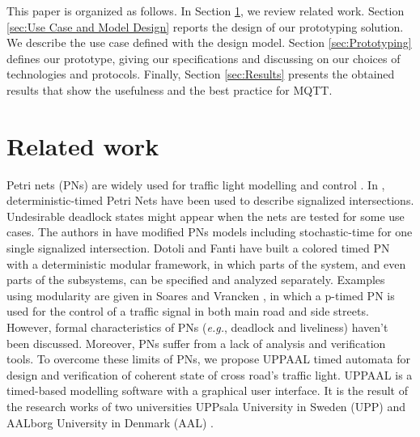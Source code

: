 \documentclass[conference]{../../setup/IEEEtran}
\begin{document}
This paper is organized as follows. In Section \ref{Sec:Related_Works}, we review related work. 
Section \ref{sec:Use Case and Model Design} reports the design of our prototyping solution. We describe the use case defined with the design model.
Section \ref{sec:Prototyping} defines our prototype, giving our specifications and discussing on our choices of technologies and protocols. Finally, Section \ref{sec:Results} presents the obtained results that show the usefulness and the best practice for MQTT.

\section{Related work}
\label{Sec:Related_Works}

Petri nets (PNs) are widely used for traffic light modelling and control \cite{huang_modular_2014}.
In  \cite{difebbraro_trafficresponsive_2006}, deterministic-timed Petri Nets have been used to describe signalized intersections. Undesirable deadlock states might appear when the nets are tested for some use cases. The authors in \cite{febbraro_using_2009} have modified PNs models including  stochastic-time for one single signalized intersection. Dotoli and Fanti \cite{dotoli_urban_2004} have built a colored timed PN with a deterministic modular framework, in which parts of the system, and even parts of the subsystems, can be specified and analyzed separately.
Examples using modularity are given in Soares and Vrancken \cite{dossantossoares_modular_2012}, in which a p-timed PN is used for the control of a traffic signal in both main road and side streets. However, formal characteristics of PNs (\emph{e.g.}, deadlock and liveliness) haven’t been discussed. Moreover, PNs suffer from a lack of analysis and verification tools. To overcome these limits of PNs, we propose UPPAAL timed automata for design and verification of coherent state of cross road's traffic light. UPPAAL is a timed-based modelling software with a graphical user interface. It is the result of the research works of two universities UPPsala University in Sweden (UPP) and AALborg University in Denmark (AAL) \cite{david_uppaal_2015}.


\end{document}
